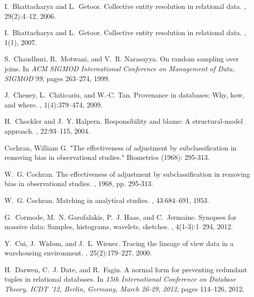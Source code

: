 \begin{thebibliography}{10}
I.~Bhattacharya and L.~Getoor.
\newblock Collective entity resolution in relational data.
, 29(2):4--12, 2006.

I.~Bhattacharya and L.~Getoor.
\newblock Collective entity resolution in relational data.
, 1(1), 2007.

S.~Chaudhuri, R.~Motwani, and V.~R. Narasayya.
\newblock On random sampling over joins.
\newblock In {\em {ACM} {SIGMOD} International Conference on Management of
  Data, SIGMOD'99}, pages 263--274, 1999.

J.~Cheney, L.~Chiticariu, and W.-C. Tan.
\newblock Provenance in databases: Why, how, and where.
, 1(4):379--474, 2009.

H.~Chockler and J.~Y. Halpern.
\newblock Responsibility and blame: A structural-model approach.
, 22:93--115, 2004.

Cochran, William G. "The effectiveness of adjustment by subclassification in removing bias in observational studies." Biometrics (1968): 295-313.

W.~G. Cochran.
\newblock The effectiveness of adjustment by subclassification in removing bias in observational studies.
,  1968, pp. 295-313.

W.~G. Cochran.
\newblock Matching in analytical studies.
, 43:684--691, 1953.


G.~Cormode, M.~N. Garofalakis, P.~J. Haas, and C.~Jermaine.
\newblock Synopses for massive data: Samples, histograms, wavelets, sketches.
, 4(1-3):1--294, 2012.

Y.~Cui, J.~Widom, and J.~L. Wiener.
\newblock Tracing the lineage of view data in a warehousing environment.
, 25(2):179--227, 2000.

H.~Darwen, C.~J. Date, and R.~Fagin.
\newblock A normal form for preventing redundant tuples in relational
  databases.
\newblock In {\em 15th International Conference on Database Theory, {ICDT} '12,
  Berlin, Germany, March 26-29, 2012}, pages 114--126, 2012.


\end{thebibliography}
